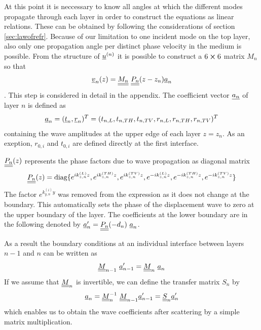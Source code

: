 At this point it is neccessary to know all angles at which the different modes
propagate through each layer in order to construct the equations as linear
relations. These can be obtained by following the considerations of section
\ref{sec:lawofrefr}.  Because of our limitation to one incident mode on the top
layer, also only one propagation angle per distinct phase velocity in the
medium is possible. From the structure of
$\underline{u}^{(n)}$ it is possible to construct a $6\cross6$ matrix $M_n$ so that
\begin{equation}
    \uline{v}_n(z) = \uuline{M_n}\ \uuline{P_n}(z-z_n)\uline{a}_n
\end{equation}.
This step is considered in detail in the appendix. The coefficient vector
$\underline{a_n}$ of layer $n$ is defined as
\begin{equation}
    \underline{a}_n = (\underline{t}_n, \underline{r}_n)^T	= (t_{n,L}, t_{n,TH}, t_{n,TV},
    r_{n,L}, r_{n,TH}, r_{n,TV})^T
\end{equation}
containing the wave amplitudes at the upper edge of each layer $z = z_n$. As an
exeption, $r_{0,i}$ and $t_{0,i}$ are defined directly at the first interface.

$\underline{\underline{P_n}}(z)$ represents the phase factors due to wave propagation
as diagonal matrix
\begin{equation} \label{eq:PmatTMM}
    \underline{\underline{P_n}}(z) = \text{diag}\{ e^{ik_{z,n}^{(L)}z},
    e^{ik_{z,n}^{(TH)}z},
    e^{ik_{z,n}^{(TV)}z}, e^{-ik_{z,n}^{(L)}z}, e^{-ik_{z,n}^{(TH)}z},
    e^{-ik_{z,n}^{(TV)}z}\}
\end{equation}
The factor $e^{k_{y,n}^{(i)} y}$ was removed from the expression as it does not
change at the boundary. This automatically sets the phase of the displacement
wave to zero at the upper boundary of the layer. The coefficients at the lower
boundary are in the following denoted by $\underline{a}_n^\prime =
    \underline{\underline{P_n}}(-d_n)\ \underline{a}_n$.

As a result the boundary conditions at an individual interface between layers
$n-1$ and $n$ can be written as
\begin{equation}
    \uuline{M}_{n-1}\ \uline{a}_{n-1}^\prime = \uuline{M}_{n}\ \uline{a}_{n}
\end{equation}
If we assume that $\underline{\underline{M}}_{n}$ is invertible, we can define the
transfer matrix $S_n$ by
\begin{equation} \label{eq:defSn}
    \underline{a}_{n} = \underline{\underline{M}}_{n}^{-1}\ \underline{\underline{M}}_{n-1}
    \underline{a}_{n-1}^\prime
    = \underline{\underline{S}}_n \underline{a}_n^\prime
\end{equation}
which enables us to obtain the wave coefficients after scattering by a simple
matrix multiplication.

